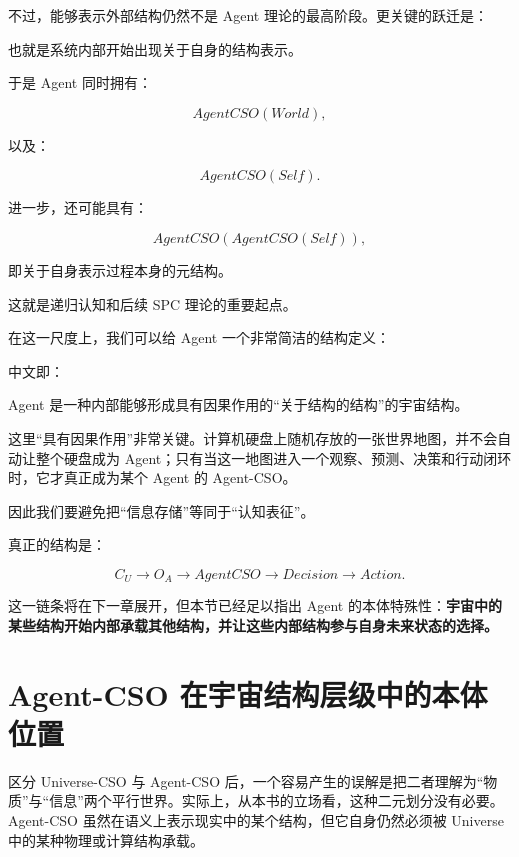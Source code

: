 不过，能够表示外部结构仍然不是 Agent 理论的最高阶段。更关键的跃迁是：

\begin{statementbox}
\centering
{}
\end{statementbox}

也就是系统内部开始出现关于自身的结构表示。

于是 Agent 同时拥有：

\[
AgentCSO(World),
\]

以及：

\[
AgentCSO(Self).
\]

进一步，还可能具有：

\[
AgentCSO
\left(
AgentCSO(Self)
\right),
\]

即关于自身表示过程本身的元结构。

这就是递归认知和后续 SPC 理论的重要起点。

在这一尺度上，我们可以给 Agent 一个非常简洁的结构定义：

\begin{statementbox}
\centering
{}
\end{statementbox}

中文即：

\begin{statementbox}
Agent 是一种内部能够形成具有因果作用的“关于结构的结构”的宇宙结构。
\end{statementbox}

这里“具有因果作用”非常关键。计算机硬盘上随机存放的一张世界地图，并不会自动让整个硬盘成为 Agent；只有当这一地图进入一个观察、预测、决策和行动闭环时，它才真正成为某个 Agent 的 Agent-CSO。

因此我们要避免把“信息存储”等同于“认知表征”。

真正的结构是：

\[
C_U
\rightarrow
O_A
\rightarrow
AgentCSO
\rightarrow
Decision
\rightarrow
Action.
\]

这一链条将在下一章展开，但本节已经足以指出 Agent 的本体特殊性：\textbf{宇宙中的某些结构开始内部承载其他结构，并让这些内部结构参与自身未来状态的选择。}

\section{Agent-CSO 在宇宙结构层级中的本体位置}

区分 Universe-CSO 与 Agent-CSO 后，一个容易产生的误解是把二者理解为“物质”与“信息”两个平行世界。实际上，从本书的立场看，这种二元划分没有必要。Agent-CSO 虽然在语义上表示现实中的某个结构，但它自身仍然必须被 Universe 中的某种物理或计算结构承载。

